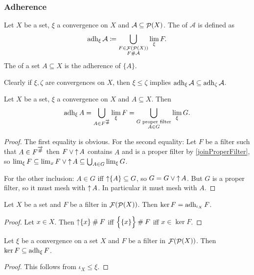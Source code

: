 \subsubsection{Adherence}
\begin{definition}
Let $X$ be a set, $\xi$ a convergence on $X$ and $\mathcal{A} \subseteq \mathop{\mathcal{P}}(X)$. The  of $\mathcal{A}$ is defined as
\[ \operatorname{adh}_\xi\mathcal{A} \coloneqq \bigcup_{\substack{F \in \mathop{\mathcal{F}}(\mathop{\mathcal{P}}(X)) \\ F \mathbin{\#} \mathcal{A}}} \lim_\xi F. \]
The  of a set $A\subseteq X$ is the adherence of $\{A\}$.
\end{definition}
Clearly if $\xi,\zeta$ are convergences on $X$, then $\xi \leq \zeta$ implies $\operatorname{adh}_\xi\mathcal{A} \subseteq \operatorname{adh}_\zeta\mathcal{A}$.

\begin{lemma}
Let $X$ be a set, $\xi$ a convergence on $X$ and $A \subseteq X$. Then
\[ \operatorname{adh}_\xi A = \bigcup_{A \in F^{\overrightarrow{\mathbin{\#}}}}\lim_\xi F = \bigcup_{\substack{\text{$G$ proper filter} \\ A\in G}}\lim_\xi G. \]
\end{lemma}
\begin{proof}
The first equality is obvious. For the second equality: Let $F$ be a filter such that $A\in F^{\overrightarrow{\mathbin{\#}}}$ then $F \vee \mathop{\uparrow} A$ contains $A$ and is a proper filter by \ref{joinProperFilter}, so $\lim_\xi F \subseteq \lim_x F \vee \mathop{\uparrow} A \subseteq \bigcup_{A\in G}\lim_\xi G$.

For the other inclusion: $A\in G$ iff $\mathop{\uparrow}\{A\} \subseteq G$, so $G = G \vee \mathop{\uparrow} A$. But $G$ is a proper filter, so it must mesh with $\mathop{\uparrow} A$. In particular it must mesh with $A$.
\end{proof}

\begin{lemma}
Let $X$ be a set and $F$ be a filter in $\mathop{\mathcal{F}}(\mathop{\mathcal{P}}(X))$. Then $\ker F = \operatorname{adh}_{\iota_X} F$.
\end{lemma}
\begin{proof}
Let $x\in X$. Then $\mathop{\uparrow}\{x\} \mathbin{\#} F$ iff $\Big\{\{x\}\Big\} \mathbin{\#} F$ iff $x\in \ker F$.
\end{proof}
\begin{corollary}
Let $\xi$ be a convergence on a set $X$ and $F$ be a filter in $\mathop{\mathcal{F}}(\mathop{\mathcal{P}}(X))$. Then $\ker F \subseteq \operatorname{adh}_\xi F$.
\end{corollary}
\begin{proof}
This follows from $\iota_X \leq \xi$.
\end{proof}

